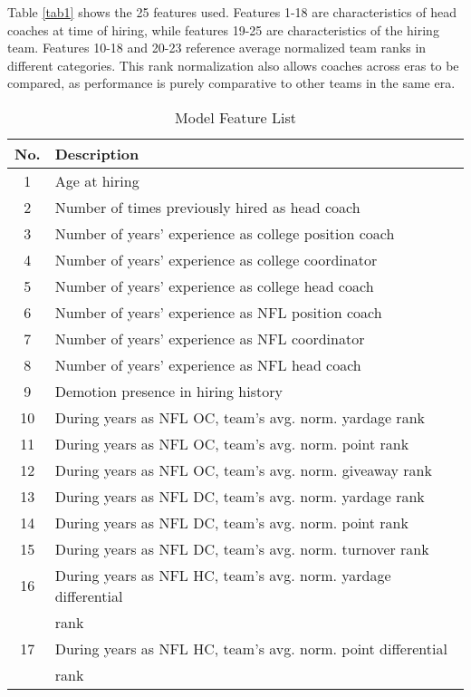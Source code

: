 \documentclass[conference]{IEEEtran}
\begin{document}
Table \ref{tab1} shows the 25 features used. Features 1-18 are characteristics of head coaches at time of hiring, while features 19-25 are characteristics of the hiring team. Features 10-18 and 20-23 reference average normalized team ranks in different categories. This rank normalization also allows coaches across eras to be compared, as performance is purely comparative to other teams in the same era. 

\begin{table}[htbp]
\caption{Model Feature List}
\begin{center}
\begin{tabular}{|c||l|}
\hline
\textbf{No.} & \textbf{Description} \\
\hline
\hline
1 & Age at hiring \\
\hline
2 & Number of times previously hired as head coach \\
\hline
3 & Number of years’ experience as college position coach \\
\hline
4 & Number of years’ experience as college coordinator \\
\hline
5 & Number of years’ experience as college head coach \\
\hline
6 & Number of years’ experience as NFL position coach \\
\hline
7 & Number of years’ experience as NFL coordinator \\
\hline
8 & Number of years’ experience as NFL head coach \\
\hline
9 & Demotion presence in hiring history \\
\hline
10 & During years as NFL OC, team’s avg. norm. yardage rank \\
\hline
11 & During years as NFL OC, team’s avg. norm. point rank \\
\hline
12 & During years as NFL OC, team’s avg. norm. giveaway rank \\
\hline
13 & During years as NFL DC, team’s avg. norm. yardage rank \\
\hline
14 & During years as NFL DC, team’s avg. norm. point rank \\
\hline
15 & During years as NFL DC, team’s avg. norm. turnover rank \\
\hline
16 & During years as NFL HC, team’s avg. norm. yardage differential\\
&rank \\
\hline
17 & During years as NFL HC, team’s avg. norm. point differential \\
&rank \\

\end{tabular}
\end{center}
\end{table}
\end{document}
